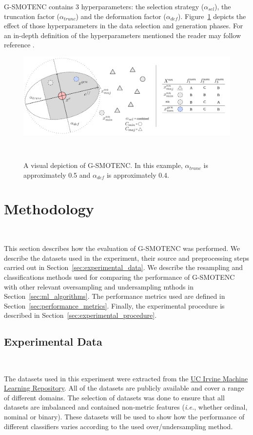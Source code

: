 \documentclass[parskip=full]{scrartcl}
\begin{document}
G-SMOTENC contains 3 hyperparameters: the selection strategy ($\alpha_{sel}$),
the truncation factor ($\alpha_{trunc}$) and the deformation factor
($\alpha_{def}$). Figure~\ref{fig:gsmote} depicts the effect of those
hyperparameters in the data selection and generation phases. For an in-depth
definition of the hyperparameters mentioned the reader may follow reference
\cite{douzas2019geometric}.

\begin{figure}
	\centering
	\includegraphics[width=\linewidth]{../analysis/g-smote}
    \caption{A visual depiction of G-SMOTENC. In this example,
        $\alpha_{trunc}$ is approximately 0.5 and $\alpha_{def}$ is
        approximately 0.4.
    }~\label{fig:gsmote}
\end{figure}

\section{Methodology}~\label{sec:methodology}

This section describes how the evaluation of G-SMOTENC was performed. We
describe the datasets used in the experiment, their source and preprocessing
steps carried out in Section~\ref{sec:experimental_data}. We describe the
resampling and classifications methods used for comparing the performance of
G-SMOTENC with other relevant oversampling and undersampling mthods in
Section~\ref{sec:ml_algorithms}. The performance metrics used are defined in
Section~\ref{sec:performance_metrics}. Finally, the experimental procedure is
described in Section~\ref{sec:experimental_procedure}.

\subsection{Experimental Data}~\label{sec:experimental_data}

The datasets used in this experiment were extracted from the
\href{https://archive.ics.uci.edu}{UC Irvine Machine Learning Repository}. All
of the datasets are publicly available and cover a range of different domains.
The selection of datasets was done to ensure that all datasets are imbalanced
and contained non-metric features (\textit{i.e.}, whether ordinal, nominal or
binary). These datasets will be used to show how the performance of different
classifiers varies according to the used over/undersampling method.
\end{document}
